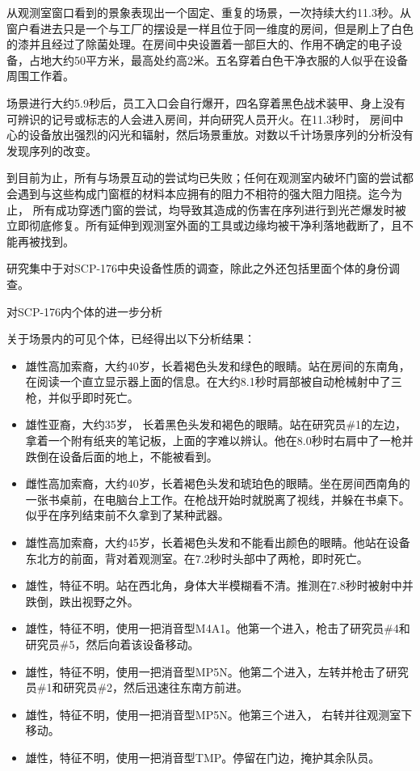 从观测室窗口看到的景象表现出一个固定、重复的场景，一次持续大约11.3秒。从窗户看进去只是一个与工厂的摆设是一样且位于同一维度的房间，但是刷上了白色的漆并且经过了除菌处理。在房间中央设置着一部巨大的、作用不确定的电子设备，占地大约50平方米，最高处约高2米。五名穿着白色干净衣服的人似乎在设备周围工作着。

场景进行大约5.9秒后，员工入口会自行爆开，四名穿着黑色战术装甲、身上没有可辨识的记号或标志的人会进入房间，并向研究人员开火。在11.3秒时， 房间中心的设备放出强烈的闪光和辐射，然后场景重放。对数以千计场景序列的分析没有发现序列的改变。

到目前为止，所有与场景互动的尝试均已失败；任何在观测室内破坏门窗的尝试都会遇到与这些构成门窗框的材料本应拥有的阻力不相符的强大阻力阻挠。迄今为止， 所有成功穿透门窗的尝试，均导致其造成的伤害在序列进行到光芒爆发时被立即彻底修复。所有延伸到观测室外面的工具或边缘均被干净利落地截断了，且不能再被找到。

研究集中于对SCP-176中央设备性质的调查，除此之外还包括里面个体的身份调查。

对SCP-176内个体的进一步分析

关于场景内的可见个体，已经得出以下分析结果：

\begin{itemize}
\item {}雄性高加索裔，大约40岁，长着褐色头发和绿色的眼睛。站在房间的东南角，在阅读一个直立显示器上面的信息。在大约8.1秒时肩部被自动枪械射中了三枪，并似乎即时死亡。
\item {}雄性亚裔，大约35岁， 长着黑色头发和褐色的眼睛。站在研究员\#1的左边，拿着一个附有纸夹的笔记板，上面的字难以辨认。他在8.0秒时右肩中了一枪并跌倒在设备后面的地上，不能被看到。
\item {}雌性高加索裔，大约40岁，长着褐色头发和琥珀色的眼睛。坐在房间西南角的一张书桌前，在电脑台上工作。在枪战开始时就脱离了视线，并躲在书桌下。似乎在序列结束前不久拿到了某种武器。
\item {}雄性高加索裔，大约45岁，长着褐色头发和不能看出颜色的眼睛。他站在设备东北方的前面，背对着观测室。在7.2秒时头部中了两枪，即时死亡。
\item {}雄性，特征不明。站在西北角，身体大半模糊看不清。推测在7.8秒时被射中并跌倒，跌出视野之外。
\item {}雄性，特征不明，使用一把消音型M4A1。他第一个进入，枪击了研究员\#4和研究员\#5，然后向着该设备移动。
\item {}雄性，特征不明，使用一把消音型MP5N。他第二个进入，左转并枪击了研究员\#1和研究员\#2，然后迅速往东南方前进。
\item {}雄性，特征不明，使用一把消音型MP5N。他第三个进入， 右转并往观测室下移动。
\item {}雄性，特征不明，使用一把消音型TMP。停留在门边，掩护其余队员。
\end{itemize}
